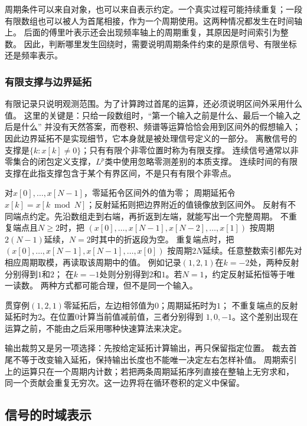 周期条件可以来自对象，也可以来自表示约定。一个真实过程可能持续重复；一段
有限数组也可以被人为首尾相接，作为一个周期使用。这两种情况都发生在时间轴上。
后面的傅里叶表示还会出现频率轴上的周期重复，其原因是时间索引为整数。
因此，判断哪里发生回绕时，需要说明周期条件约束的是原信号、有限坐标还是频率表示。

\subsubsection{有限支撑与边界延拓}

有限记录只说明观测范围。为了计算跨过首尾的运算，还必须说明区间外采用什么值。
这里的关键是：只给一段数组时，“第一个输入之前是什么、最后一个输入之后是什么”
并没有天然答案，而卷积、频谱等运算恰恰会用到区间外的假想输入；
因此边界延拓不是实现细节，它本身就是被处理信号定义的一部分。
离散信号的支撑是$\{k:x[k]\neq0\}$；只有有限个非零位置时称为有限支撑。
连续信号通常以非零集合的闭包定义支撑，$L^p$类中使用忽略零测差别的本质支撑。
连续时间的有限支撑在此指支撑包含于某个有界区间，不是只有有限个非零点。

对$x[0],\ldots,x[N-1]$，零延拓令区间外的值为零；
周期延拓令$x[k]=x[k\bmod N]$；反射延拓则把边界附近的值镜像放到区间外。
反射有不同端点约定。先沿数组走到右端，再折返到左端，就能写出一个完整周期。
不重复端点且$N\geq2$时，把
$(x[0],\ldots,x[N-1],x[N-2],\ldots,x[1])$
按周期$2(N-1)$延续，$N=2$时其中的折返段为空。
重复端点时，把$(x[0],\ldots,x[N-1],x[N-1],\ldots,x[0])$
按周期$2N$延续。任意整数索引都先对相应周期取模，再读取该周期中的值。
例如记录$(1,2,1)$在$k=-2$处，两种反射分别得到$1$和$2$；
在$k=-1$处则分别得到$2$和$1$。若$N=1$，约定反射延拓恒等于唯一读数。
两种方式都可能合理，但不是同一个输入。

贯穿例$(1,2,1)$零延拓后，左边相邻值为$0$；周期延拓时为$1$；
不重复端点的反射延拓时为$2$。在位置$0$计算当前值减前值，三者分别得到
$1,0,-1$。这个差别出现在运算之前，不能由之后采用哪种快速算法来决定。

输出裁剪又是另一项选择：先按给定延拓计算输出，再只保留指定位置。
裁去首尾不等于改变输入延拓，保持输出长度也不能唯一决定左右怎样补值。
周期索引上的运算只在一个周期内计数；若把两条周期延拓序列直接在整轴上无穷求和，
同一个贡献会重复无穷次。这一边界将在循环卷积的定义中保留。

\subsection{信号的时域表示}
\label{sec:signal-time-impulses}

